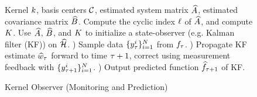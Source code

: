 \begin{figure}[t!]
	\begin{algorithm}[H]
		\caption{Kernel Observer (Monitoring and Prediction)}
		\label{alg:egp_inf}
		\begin{algorithmic}
				 Kernel $k$, basis centers $\mathcal{C}$, 
				estimated system matrix $\widehat{A}$, estimated covariance matrix $\widehat{B}$.
				 Compute the cyclic index $\ell$ of $\widehat{A}$, and compute $K$.
				 Use $\widehat{A}$, $\widehat{B}$, and $K$ to initialize a state-observer (e.g. Kalman filter (KF)) on $\widehat{\mathcal{H}}$.
				) Sample data $\{y^i_{\tau}\}_{i=1}^{N}$ from $f_{\tau}$.
				) Propagate KF estimate $\widehat{w}_{\tau}$ 
				forward to time $\tau+1$, correct using measurement feedback with $\{y^i_{\tau+1}\}_{i=1}^{N}$. 
				) Output predicted function $\widehat{f}_{\tau+1}$ of KF.
				\ENDWHILE   
		\end{algorithmic}
	\end{algorithm}
	\vspace{-0.2in}
\end{figure}
% 

